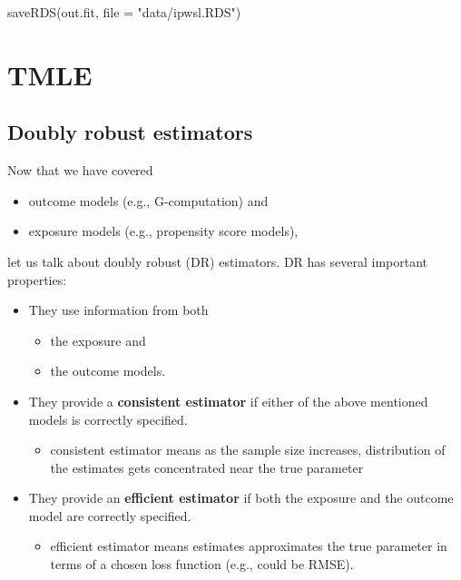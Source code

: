 \documentclass[
]{book}
\newenvironment{Shaded}{\begin{snugshade}}{\end{snugshade}}
\newcommand{\AttributeTok}[1]{\textcolor[rgb]{0.77,0.63,0.00}{#1}}
\newcommand{\FunctionTok}[1]{\textcolor[rgb]{0.00,0.00,0.00}{#1}}
\newcommand{\NormalTok}[1]{#1}
\newcommand{\StringTok}[1]{\textcolor[rgb]{0.31,0.60,0.02}{#1}}
\providecommand{\tightlist}{%
  \setlength{\itemsep}{0pt}\setlength{\parskip}{0pt}}
\begin{document}
\begin{Shaded}
\begin{Highlighting}[]
\FunctionTok{saveRDS}\NormalTok{(out.fit, }\AttributeTok{file =} \StringTok{"data/ipwsl.RDS"}\NormalTok{)}
\end{Highlighting}
\end{Shaded}

\hypertarget{tmle}{%
\chapter{TMLE}\label{tmle}}

\hypertarget{doubly-robust-estimators}{%
\section{Doubly robust estimators}\label{doubly-robust-estimators}}

Now that we have covered

\begin{itemize}
\tightlist
\item
  outcome models (e.g., G-computation) and
\item
  exposure models (e.g., propensity score models),
\end{itemize}

let us talk about doubly robust (DR) estimators. DR has several important properties:

\begin{itemize}
\tightlist
\item
  They use information from both

  \begin{itemize}
  \tightlist
  \item
    the exposure and
  \item
    the outcome models.
  \end{itemize}
\item
  They provide a \textbf{consistent estimator} if either of the above mentioned models is correctly specified.

  \begin{itemize}
  \tightlist
  \item
    consistent estimator means as the sample size increases, distribution of the estimates gets concentrated near the true parameter
  \end{itemize}
\item
  They provide an \textbf{efficient estimator} if both the exposure and the outcome model are correctly specified.

  \begin{itemize}
  \tightlist
  \item
    efficient estimator means estimates approximates the true parameter in terms of a chosen loss function (e.g., could be RMSE).
  \end{itemize}
\end{itemize}
\end{document}
